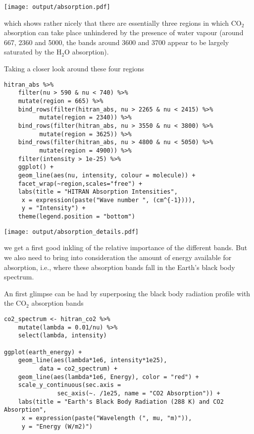\documentclass[10pt,a4paper,titlepage]{article}
\begin{document}
\texttt{[image: output/absorption.pdf]}

which shows rather nicely that there are essentially three regions in
which CO$_{\text{2}}$ absorption can take place unhindered by the presence of
water vapour (around 667, 2360 and
\unit{5000}{\centi\reciprocal\metre}, the bands around 3600 and
\unit{3700}{\centi\reciprocal\metre} appear to be largely saturated by
the H$_{\text{2}}$O absorption).

Taking a closer look around these four regions
\begin{lstlisting}
hitran_abs %>%
    filter(nu > 590 & nu < 740) %>%
    mutate(region = 665) %>%
    bind_rows(filter(hitran_abs, nu > 2265 & nu < 2415) %>%
	      mutate(region = 2340)) %>%
    bind_rows(filter(hitran_abs, nu > 3550 & nu < 3800) %>%
	      mutate(region = 3625)) %>%
    bind_rows(filter(hitran_abs, nu > 4800 & nu < 5050) %>%
	      mutate(region = 4900)) %>%
    filter(intensity > 1e-25) %>%
    ggplot() +
    geom_line(aes(nu, intensity, colour = molecule)) +
    facet_wrap(~region,scales="free") +
    labs(title = "HITRAN Absorption Intensities",
	 x = expression(paste("Wave number ", (cm^{-1}))),
	 y = "Intensity") +
    theme(legend.position = "bottom")
\end{lstlisting}

\texttt{[image: output/absorption\_details.pdf]}

we get a first good inkling of the relative importance of the
different bands. But we also need to bring into consideration the
amount of energy available for absorption, i.e., where these
absorption bands fall in the Earth's black body spectrum.

An first glimpse can be had by superposing the black body radiation
profile with the CO$_{\text{2}}$ absorption bands

\begin{lstlisting}
co2_spectrum <- hitran_co2 %>%
    mutate(lambda = 0.01/nu) %>%
    select(lambda, intensity)

ggplot(earth_energy) +
    geom_line(aes(lambda*1e6, intensity*1e25),
	      data = co2_spectrum) +
    geom_line(aes(lambda*1e6, Energy), color = "red") +
    scale_y_continuous(sec.axis =
			   sec_axis(~. /1e25, name = "CO2 Absorption")) +
    labs(title = "Earth's Black Body Radiation (288 K) and CO2 Absorption",
	 x = expression(paste("Wavelength (", mu, "m)")),
	 y = "Energy (W/m2)")
\end{lstlisting}
\end{document}
